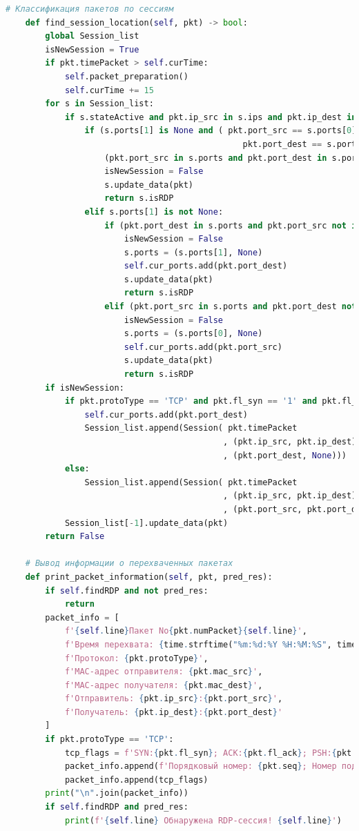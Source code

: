 \documentclass[spec, och, diploma]{SCWorks}
\begin{document}
\begin{lstlisting}[language=Python]
    # Классификация пакетов по сессиям
    def find_session_location(self, pkt) -> bool:
        global Session_list
        isNewSession = True
        if pkt.timePacket > self.curTime:
            self.packet_preparation()
            self.curTime += 15
        for s in Session_list:
            if s.stateActive and pkt.ip_src in s.ips and pkt.ip_dest in s.ips:
                if (s.ports[1] is None and ( pkt.port_src == s.ports[0] or \
                                                pkt.port_dest == s.ports[0]) ) or \
                    (pkt.port_src in s.ports and pkt.port_dest in s.ports):
                    isNewSession = False
                    s.update_data(pkt)
                    return s.isRDP
                elif s.ports[1] is not None:
                    if (pkt.port_dest in s.ports and pkt.port_src not in s.ports):
                        isNewSession = False
                        s.ports = (s.ports[1], None)
                        self.cur_ports.add(pkt.port_dest)
                        s.update_data(pkt)
                        return s.isRDP
                    elif (pkt.port_src in s.ports and pkt.port_dest not in s.ports):
                        isNewSession = False
                        s.ports = (s.ports[0], None)
                        self.cur_ports.add(pkt.port_src)
                        s.update_data(pkt)
                        return s.isRDP
        if isNewSession:
            if pkt.protoType == 'TCP' and pkt.fl_syn == '1' and pkt.fl_ack == '0':
                self.cur_ports.add(pkt.port_dest)
                Session_list.append(Session( pkt.timePacket
                                            , (pkt.ip_src, pkt.ip_dest)
                                            , (pkt.port_dest, None)))
            else:
                Session_list.append(Session( pkt.timePacket
                                            , (pkt.ip_src, pkt.ip_dest)
                                            , (pkt.port_src, pkt.port_dest)))
            Session_list[-1].update_data(pkt)
        return False

    # Вывод информации о перехваченных пакетах
    def print_packet_information(self, pkt, pred_res):
        if self.findRDP and not pred_res:
            return
        packet_info = [
            f'{self.line}Пакет No{pkt.numPacket}{self.line}',
            f'Время перехвата: {time.strftime("%m:%d:%Y %H:%M:%S", time.localtime(pkt.timePacket))}',
            f'Протокол: {pkt.protoType}',
            f'MAC-адрес отправителя: {pkt.mac_src}',
            f'MAC-адрес получателя: {pkt.mac_dest}',
            f'Отправитель: {pkt.ip_src}:{pkt.port_src}',
            f'Получатель: {pkt.ip_dest}:{pkt.port_dest}'
        ]
        if pkt.protoType == 'TCP':
            tcp_flags = f'SYN:{pkt.fl_syn}; ACK:{pkt.fl_ack}; PSH:{pkt.fl_psh}; RST:{pkt.fl_rst}; FIN:{pkt.fl_fin}'
            packet_info.append(f'Порядковый номер: {pkt.seq}; Номер подтверждения: {pkt.ack}')
            packet_info.append(tcp_flags)
        print("\n".join(packet_info))
        if self.findRDP and pred_res:
            print(f'{self.line} Обнаружена RDP-сессия! {self.line}')
    

\end{lstlisting}
\end{document}
